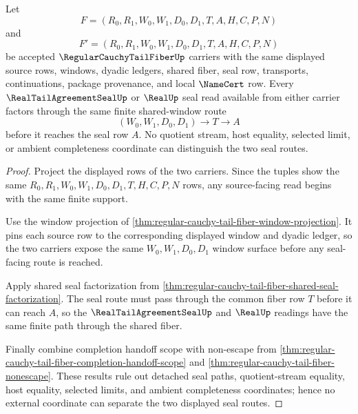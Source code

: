 \begin{theorem}
\label{thm:regular-cauchy-tail-fiber-shared-window-seal-determinacy}
Let
$$
F=(R_0,R_1,W_0,W_1,D_0,D_1,T,A,H,C,P,N)
$$
and
$$
F'=(R_0,R_1,W_0,W_1,D_0,D_1,T,A,H,C,P,N)
$$
be accepted $\RegularCauchyTailFiberUp$ carriers with the same displayed source rows, windows, dyadic ledgers, shared fiber, seal row, transports, continuations, package provenance, and local $\NameCert$ row. Every $\RealTailAgreementSealUp$ or $\RealUp$ seal read available from either carrier factors through the same finite shared-window route
$$
(W_0,W_1,D_0,D_1)\longrightarrow T\longrightarrow A
$$
before it reaches the seal row $A$. No quotient stream, host equality, selected limit, or ambient completeness coordinate can distinguish the two seal routes.
\end{theorem}
\begin{proof}
Project the displayed rows of the two carriers. Since the tuples show the same $R_0,R_1,W_0,W_1,D_0,D_1,T,H,C,P,N$ rows, any source-facing read begins with the same finite support.

Use the window projection of \autoref{thm:regular-cauchy-tail-fiber-window-projection}. It pins each source row to the corresponding displayed window and dyadic ledger, so the two carriers expose the same $W_0,W_1,D_0,D_1$ window surface before any seal-facing route is reached.

Apply shared seal factorization from \autoref{thm:regular-cauchy-tail-fiber-shared-seal-factorization}. The seal route must pass through the common fiber row $T$ before it can reach $A$, so the $\RealTailAgreementSealUp$ and $\RealUp$ readings have the same finite path through the shared fiber.

Finally combine completion handoff scope with non-escape from \autoref{thm:regular-cauchy-tail-fiber-completion-handoff-scope} and \autoref{thm:regular-cauchy-tail-fiber-nonescape}. These results rule out detached seal paths, quotient-stream equality, host equality, selected limits, and ambient completeness coordinates; hence no external coordinate can separate the two displayed seal routes.
\end{proof}

